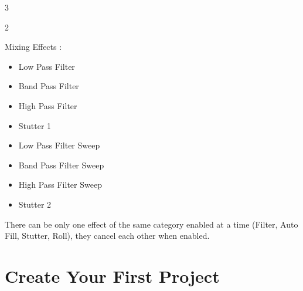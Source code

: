 \documentclass[8pt]{extarticle}
\begin{document}
\begin{multicols*}{3}
\begin{multicols}{2}
    \columnbreak

    Mixing Effects :
    \begin{itemize}
    \item[\kbd{5}] Low Pass Filter
    \item[\kbd{6}] Band Pass Filter
    \item[\kbd{7}] High Pass Filter
    \item[\kbd{8}] Stutter 1
    \item[\kbd{13}] Low Pass Filter Sweep
    \item[\kbd{14}] Band Pass Filter Sweep
    \item[\kbd{15}] High Pass Filter Sweep
    \item[\kbd{16}] Stutter 2
    \end{itemize}
\end{multicols}

There can be only one effect of the same category enabled at a time (Filter, Auto Fill, Stutter, Roll), they cancel each other when enabled.

\section{Create Your First Project}


\end{multicols*}
\end{document}

